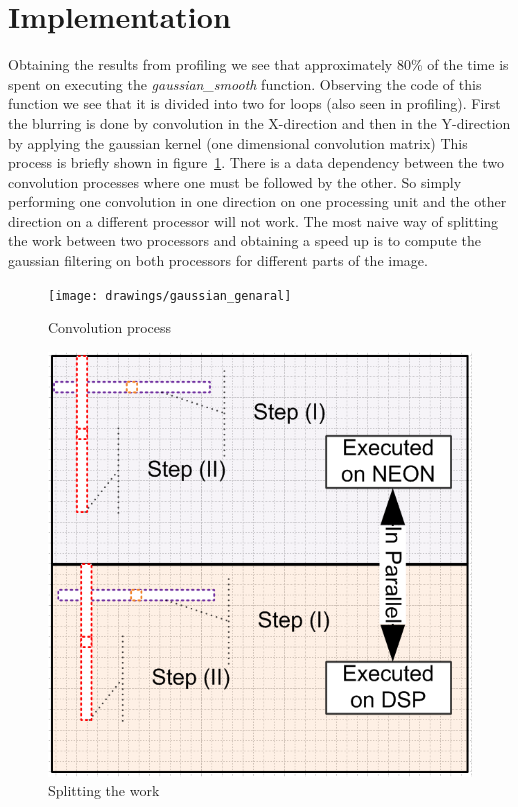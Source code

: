 \section{Implementation}
Obtaining the results from profiling we see that approximately 80\% of the time is spent on executing the \textit{gaussian_smooth} function. Observing the code of this function we see that it is divided into two for loops (also seen in profiling). First the blurring is done by convolution in the X-direction and then in the Y-direction by applying the gaussian kernel (one dimensional convolution matrix) This process is briefly shown in figure~\ref{fig:convolution}. There is a data dependency between the two convolution processes where one must be followed by the other. So simply performing one convolution in one direction on one processing unit and the other direction on a different processor will not work. The most naive way of splitting the work between two processors and obtaining a speed up is to compute the gaussian filtering on both processors for different parts of the image. 

\begin{figure}
\texttt{[image: drawings/gaussian\_genaral]}
\caption{Convolution process}
\label{fig:convolution}
\end{figure}


\begin{figure}
\includegraphics[width=\textwidth]{drawings/gaussian_balancing}
\caption{Splitting the work}
\label{fig:balancing}
\end{figure}



